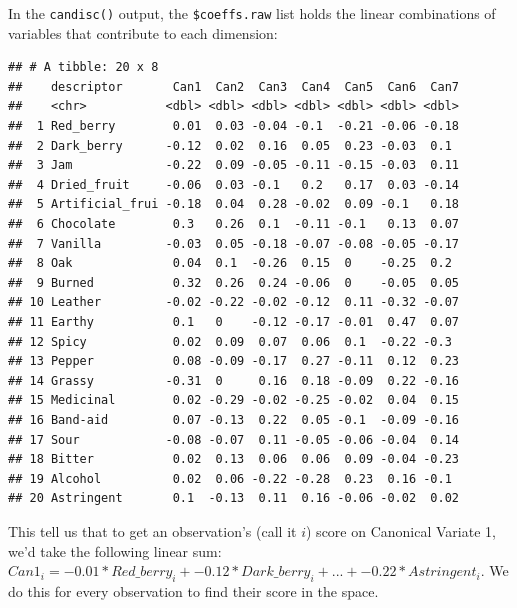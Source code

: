 \documentclass[
]{book}
\newenvironment{Shaded}{\begin{snugshade}}{\end{snugshade}}
\newcommand{\AttributeTok}[1]{\textcolor[rgb]{0.13,0.29,0.53}{#1}}
\newcommand{\DecValTok}[1]{\textcolor[rgb]{0.00,0.00,0.81}{#1}}
\newcommand{\FunctionTok}[1]{\textcolor[rgb]{0.13,0.29,0.53}{\textbf{#1}}}
\newcommand{\NormalTok}[1]{#1}
\newcommand{\SpecialCharTok}[1]{\textcolor[rgb]{0.81,0.36,0.00}{\textbf{#1}}}
\newcommand{\StringTok}[1]{\textcolor[rgb]{0.31,0.60,0.02}{#1}}
\begin{document}
In the \texttt{candisc()} output, the \texttt{\$coeffs.raw} list holds the linear combinations of variables that contribute to each dimension:

\begin{Shaded}
\end{Shaded}

\begin{verbatim}
## # A tibble: 20 x 8
##    descriptor       Can1  Can2  Can3  Can4  Can5  Can6  Can7
##    <chr>           <dbl> <dbl> <dbl> <dbl> <dbl> <dbl> <dbl>
##  1 Red_berry        0.01  0.03 -0.04 -0.1  -0.21 -0.06 -0.18
##  2 Dark_berry      -0.12  0.02  0.16  0.05  0.23 -0.03  0.1 
##  3 Jam             -0.22  0.09 -0.05 -0.11 -0.15 -0.03  0.11
##  4 Dried_fruit     -0.06  0.03 -0.1   0.2   0.17  0.03 -0.14
##  5 Artificial_frui -0.18  0.04  0.28 -0.02  0.09 -0.1   0.18
##  6 Chocolate        0.3   0.26  0.1  -0.11 -0.1   0.13  0.07
##  7 Vanilla         -0.03  0.05 -0.18 -0.07 -0.08 -0.05 -0.17
##  8 Oak              0.04  0.1  -0.26  0.15  0    -0.25  0.2 
##  9 Burned           0.32  0.26  0.24 -0.06  0    -0.05  0.05
## 10 Leather         -0.02 -0.22 -0.02 -0.12  0.11 -0.32 -0.07
## 11 Earthy           0.1   0    -0.12 -0.17 -0.01  0.47  0.07
## 12 Spicy            0.02  0.09  0.07  0.06  0.1  -0.22 -0.3 
## 13 Pepper           0.08 -0.09 -0.17  0.27 -0.11  0.12  0.23
## 14 Grassy          -0.31  0     0.16  0.18 -0.09  0.22 -0.16
## 15 Medicinal        0.02 -0.29 -0.02 -0.25 -0.02  0.04  0.15
## 16 Band-aid         0.07 -0.13  0.22  0.05 -0.1  -0.09 -0.16
## 17 Sour            -0.08 -0.07  0.11 -0.05 -0.06 -0.04  0.14
## 18 Bitter           0.02  0.13  0.06  0.06  0.09 -0.04 -0.23
## 19 Alcohol          0.02  0.06 -0.22 -0.28  0.23  0.16 -0.1 
## 20 Astringent       0.1  -0.13  0.11  0.16 -0.06 -0.02  0.02
\end{verbatim}

This tell us that to get an observation's (call it \(i\)) score on Canonical Variate 1, we'd take the following linear sum: \(Can1_i = -0.01*Red\_berry_i + -0.12*Dark\_berry_i + ... + -0.22*Astringent_i\). We do this for every observation to find their score in the space.
\end{document}
